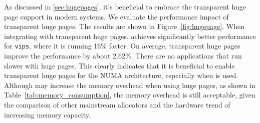As discussed in \ref{sec:hugepages}, it's beneficial to embrace the transparent huge page support in modern systems. We evaluate the performance impact of transparent huge pages. The results are shown in Figure~\ref{fig:hugepage}. When integrating with transparent huge pages, \NM{} achieves significantly better performance for \texttt{vips}, where it is running 16\% faster. On average, transparent huge pages improve the performance by about 2.62\%. There are no applications that run slower with huge pages. This clearly indicates that it is beneficial to enable transparent huge pages for the NUMA architecture, especially when \NM{} is used. 
Although \NM{} may increase the memory overhead 
when using huge pages, as shown in Table~\ref{tab:memory_consumption}, the memory overhead is still acceptable, given the comparison of other mainstream allocators and the hardware trend of increasing memory capacity.


